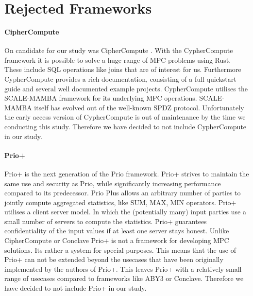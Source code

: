 \section{Rejected Frameworks}
\paragraph{CipherCompute}
On candidate for our study was CipherCompute \cite{Cosmian}. With the CypherCompute framework it is possible to solve a huge range of MPC problems using Rust. These include SQL operations like joins that are of interest for us. Furthermore CypherCompute provides a rich documentation, consisting of a full quickstart guide and several well documented example projects. CypherCompute utilises the SCALE-MAMBA \cite{aly2021scale} framework for its underlying MPC operations. SCALE-MAMBA  itself has evolved out of the well-known SPDZ \cite{SPDZ} protocol. Unfortunately the early access version of CypherCompute is out of maintenance by the time we conducting this study. Therefore we have decided to not include CypherCompute in our study.

\paragraph{Prio+}
Prio+ \cite{cryptoeprint:2021:576} is the next generation of the Prio \cite{201553} framework. Prio+ strives to maintain the same use and security as Prio, while significantly increasing performance compared to its predecessor. Prio Plus allows an arbitrary number of parties to jointly compute aggregated statistics, like SUM, MAX, MIN operators. Prio+ utilises a client server model. In which the (potentially many) input parties use a small number of servers to compute the statistics. Prio+ guarantees confidentiality of the input values if at least one server stays honest. Unlike CipherCompute or Conclave Prio+ is not a framework for developing MPC solutions. Its rather a system for special purposes. This means that the use of Prio+ can not be extended beyond the usecases that have been originally implemented by the authors of Prio+. This leaves Prio+ with a relatively small range of usecases compared to frameworks like ABY3 or Conclave. Therefore we have decided to not include Prio+ in our study.

